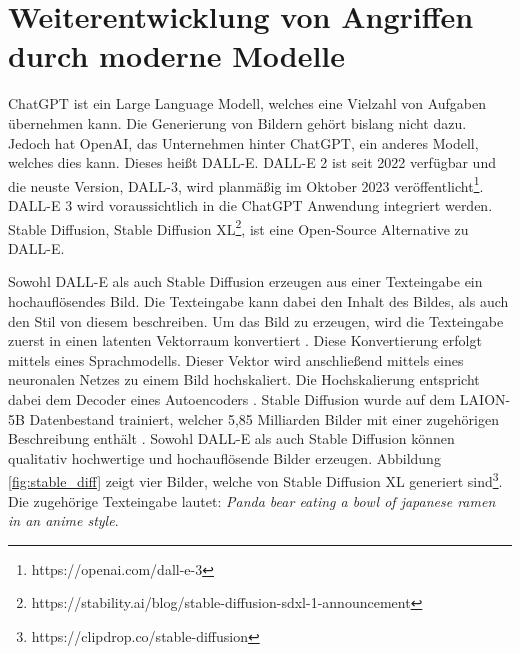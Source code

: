 \section{Weiterentwicklung von Angriffen durch moderne Modelle}

ChatGPT ist ein Large Language Modell, welches eine Vielzahl von Aufgaben übernehmen kann.
Die Generierung von Bildern gehört bislang nicht dazu.
Jedoch hat OpenAI, das Unternehmen hinter ChatGPT, ein anderes Modell, welches dies kann.
Dieses heißt DALL-E. 
DALL-E 2 ist seit 2022 verfügbar und die neuste Version, DALL-3, wird planmäßig im Oktober 2023 veröffentlicht\footnote{https://openai.com/dall-e-3}.
DALL-E 3 wird voraussichtlich in die ChatGPT Anwendung integriert werden.
Stable Diffusion, \bzw Stable Diffusion XL\footnote{https://stability.ai/blog/stable-diffusion-sdxl-1-announcement}, ist eine Open-Source Alternative zu DALL-E.

Sowohl DALL-E als auch Stable Diffusion erzeugen aus einer Texteingabe ein hochauflösendes Bild.
Die Texteingabe kann dabei den Inhalt des Bildes, als auch den Stil von diesem beschreiben.
Um das Bild zu erzeugen, wird die Texteingabe zuerst in einen latenten Vektorraum konvertiert \cite{stable_diffusion_explained}. 
Diese Konvertierung erfolgt mittels eines Sprachmodells.
Dieser Vektor wird anschließend mittels eines neuronalen Netzes zu einem Bild hochskaliert.
Die Hochskalierung entspricht dabei dem Decoder eines Autoencoders \cite{stable_diffusion_explained}.
Stable Diffusion wurde auf dem LAION-5B Datenbestand trainiert, welcher 5,85 Milliarden Bilder mit einer zugehörigen Beschreibung enthält \cite{laion}.
Sowohl DALL-E als auch Stable Diffusion können qualitativ hochwertige und hochauflösende Bilder erzeugen.
Abbildung \ref{fig:stable_diff} zeigt vier Bilder, welche von Stable Diffusion XL generiert sind\footnote{https://clipdrop.co/stable-diffusion}. Die zugehörige Texteingabe lautet: 
\dq\textit{Panda bear eating a bowl of japanese ramen in an anime style}\dq.

